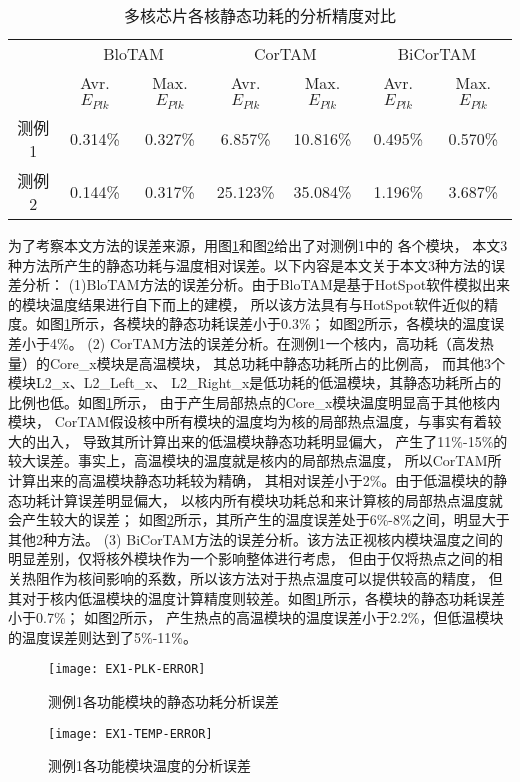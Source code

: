\begin{table}
\centering
\caption{多核芯片各核静态功耗的分析精度对比}
\begin{tabular}{c c c c c c c}
\hline\hline
 & \multicolumn{2}{c}{BloTAM} & \multicolumn{2}{c}{CorTAM} & \multicolumn{2}{c}{BiCorTAM} \\
 & Avr.$E_{Plk}$ & Max.$E_{Plk}$ & Avr.$E_{Plk}$ & Max.$E_{Plk}$ & Avr.$E_{Plk}$ & Max.$E_{Plk}$ \\
\hline
测例1 & 0.314\% & 0.327\% & 6.857\% & 10.816\% & 0.495\% & 0.570\% \\
\hline
测例2 & 0.144\% & 0.317\% & 25.123\% & 35.084\% & 1.196\% & 3.687\% \\
\hline
\end{tabular}
\label{tab:chap5:power-leakage-error}
\end{table}


为了考察本文方法的误差来源，用图\ref{fig:ex1-plk-error}和图\ref{fig:ex1-temp-error}给出了对测例1中的 各个模块， 本文3种方法所产生的静态功耗与温度相对误差。以下内容是本文关于本文3种方法的误差分析：
(1)BloTAM方法的误差分析。由于BloTAM是基于HotSpot软件模拟出来的模块温度结果进行自下而上的建模， 所以该方法具有与HotSpot软件近似的精度。如图\ref{fig:ex1-plk-error}所示，各模块的静态功耗误差小于0.3\%； 如图\ref{fig:ex1-temp-error}所示，各模块的温度误差小于4\%。
(2) CorTAM方法的误差分析。在测例1一个核内，高功耗（高发热量）的Core\_x模块是高温模块， 其总功耗中静态功耗所占的比例高， 而其他3个模块L2\_x、L2\_Left\_x、 L2\_Right\_x是低功耗的低温模块，其静态功耗所占的比例也低。如图\ref{fig:ex1-plk-error}所示， 由于产生局部热点的Core\_x模块温度明显高于其他核内模块， CorTAM假设核中所有模块的温度均为核的局部热点温度，与事实有着较大的出入， 导致其所计算出来的低温模块静态功耗明显偏大， 产生了11\%-15\%的较大误差。事实上，高温模块的温度就是核内的局部热点温度， 所以CorTAM所计算出来的高温模块静态功耗较为精确， 其相对误差小于2\%。由于低温模块的静态功耗计算误差明显偏大， 以核内所有模块功耗总和来计算核的局部热点温度就会产生较大的误差； 如图\ref{fig:ex1-temp-error}所示，其所产生的温度误差处于6\%-8\%之间，明显大于其他2种方法。
(3) BiCorTAM方法的误差分析。该方法正视核内模块温度之间的明显差别，仅将核外模块作为一个影响整体进行考虑， 但由于仅将热点之间的相关热阻作为核间影响的系数，所以该方法对于热点温度可以提供较高的精度， 但其对于核内低温模块的温度计算精度则较差。如图\ref{fig:ex1-plk-error}所示，各模块的静态功耗误差小于0.7\%； 如图\ref{fig:ex1-temp-error}所示， 产生热点的高温模块的温度误差小于2.2\%，但低温模块的温度误差则达到了5\%-11\%。

\begin{figure}[H]
  \centering
  \texttt{[image: EX1-PLK-ERROR]}
  \caption{测例1各功能模块的静态功耗分析误差}
  \label{fig:ex1-plk-error}
\end{figure}
\begin{figure}[H]
  \centering
  \texttt{[image: EX1-TEMP-ERROR]}
  \caption{测例1各功能模块温度的分析误差}
  \label{fig:ex1-temp-error}
\end{figure}


